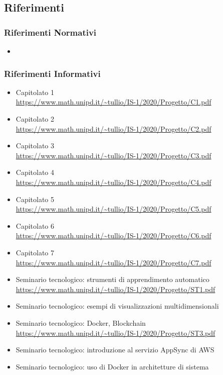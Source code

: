 \subsection{Riferimenti}
\subsubsection{Riferimenti Normativi}
\begin{itemize}
	\item {} %
\end{itemize}

\subsubsection{Riferimenti Informativi}
\begin{itemize}
	\item{Capitolato 1\\
		\url{https://www.math.unipd.it/~tullio/IS-1/2020/Progetto/C1.pdf}}
	\item{Capitolato 2\\
		\url{https://www.math.unipd.it/~tullio/IS-1/2020/Progetto/C2.pdf}}
	\item{Capitolato 3\\
		\url{https://www.math.unipd.it/~tullio/IS-1/2020/Progetto/C3.pdf}}
	\item{Capitolato 4\\
		\url{https://www.math.unipd.it/~tullio/IS-1/2020/Progetto/C4.pdf}}
	\item{Capitolato 5\\
		\url{https://www.math.unipd.it/~tullio/IS-1/2020/Progetto/C5.pdf}}
	\item{Capitolato 6\\
		\url{https://www.math.unipd.it/~tullio/IS-1/2020/Progetto/C6.pdf}}
	\item{Capitolato 7\\
		\url{https://www.math.unipd.it/~tullio/IS-1/2020/Progetto/C7.pdf}}
	
	\item {Seminario tecnologico: strumenti di apprendimento automatico\\
		\url{https://www.math.unipd.it/~tullio/IS-1/2020/Progetto/ST1.pdf}}
	\item {Seminario tecnologico: esempi di visualizzazioni multidimensionali}
	
	\item {Seminario tecnologico: Docker, Blockchain\\
		\url{https://www.math.unipd.it/~tullio/IS-1/2020/Progetto/ST3.pdf}}
	\item {Seminario tecnologico: introduzione al servizio AppSync di AWS}
	
	\item {Seminario tecnologico: uso di Docker in architetture di sistema}
\end{itemize}

